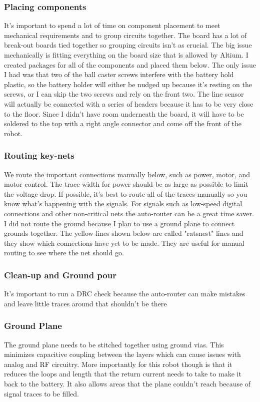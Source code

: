 \documentclass[11pt]{article}
\begin{document}
\subsubsection{Placing components}
It's important to spend a lot of time on component placement to meet mechanical requirements and to group circuits together. The board has a lot of break-out boards tied together so grouping circuits isn't as crucial. The big issue mechanically is fitting everything on the board size that is allowed by Altium. I created packages for all of the components and placed them below. The only issue I had was that two of the ball caster screws interfere with the battery hold plastic, so the battery holder will either be nudged up because it's resting on the screws, or I can skip the two screws and rely on the front two. The line sensor will actually be connected with a series of headers because it has to be very close to the floor. Since I didn't have room underneath the board, it will have to be soldered to the top with a right angle connector and come off the front of the robot.
\subsubsection{Routing key-nets}
We route the important connections manually below, such as power, motor, and motor control. The trace width for power should be as large as possible to limit the voltage drop. If possible, it's best to route all of the traces manually so you know what's happening with the signals. For signals such as low-speed digital connections and other non-critical nets the auto-router can be a great time saver. I did not route the ground because I plan to use a ground plane to connect grounds together. The yellow lines shown below are called "ratsnest" lines and they show which connections have yet to be made. They are useful for manual routing to see where the net should go.
\subsubsection{Clean-up and Ground pour}
It's important to run a DRC check because the auto-router can make mistakes and leave little traces around that shouldn't be there
\subsubsection{Ground Plane}
The ground plane needs to be stitched together using ground vias. This minimizes capacitive coupling between the layers which can cause issues with analog and RF circuitry. More importantly for this robot though is that it reduces the loops and length that the return current needs to take to make it back to the battery. It also allows areas that the plane couldn't reach because of signal traces to be filled.
\end{document}
